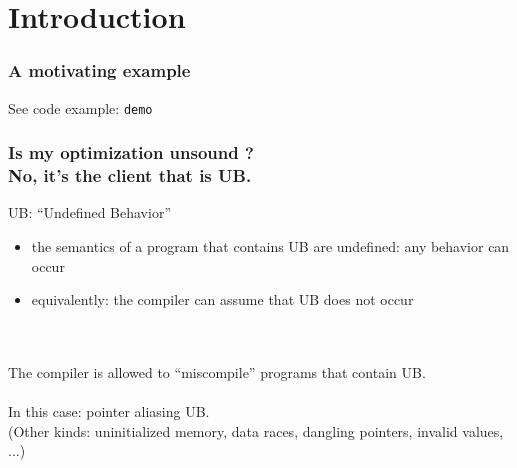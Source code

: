 \begin{frame}
    \titlepage
\end{frame}

\section{Introduction}


\begin{frame}[fragile,t]
    \frametitle{A motivating example}
    See code example: \texttt{demo}
\end{frame}

\begin{frame}
    \frametitle{Is my optimization unsound ?\\No, it's the client that is UB.}
    UB: ``Undefined Behavior''
    \begin{itemize}
        \item the semantics of a program that contains UB are undefined: any behavior can occur
        \item equivalently: the compiler can assume that UB does not occur
    \end{itemize}~\\~\\

    The compiler is allowed to ``miscompile'' programs that contain UB.~\\~\\

    In this case: pointer aliasing UB.\\
    (Other kinds: uninitialized memory, data races, dangling pointers, invalid values, ...)
\end{frame}


